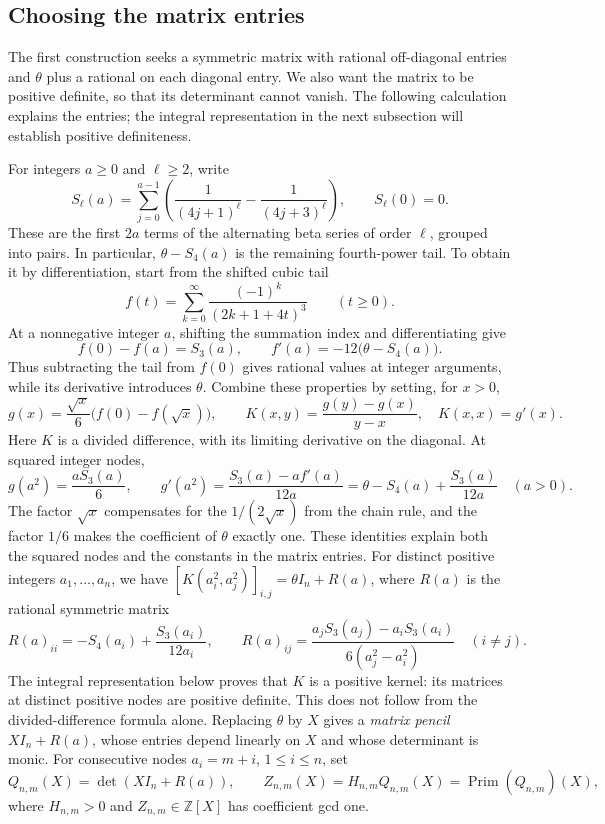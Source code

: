 \documentclass[11pt]{article}
\theoremstyle{definition}
\theoremstyle{remark}
\numberwithin{equation}{section}
\newcommand{\Z}{\mathbb Z}
\newcommand{\PP}{\operatorname{Prim}}
\begin{document}
\subsection{Choosing the matrix entries}\label{sec:kernel-construction}

The first construction seeks a symmetric matrix with rational
off-diagonal entries and $\theta$ plus a rational on each
diagonal entry. We also want the matrix to be positive definite, so
that its determinant cannot vanish. The following calculation explains
the entries; the integral representation in the next subsection will
establish positive definiteness.

For integers $a\geq 0$ and $\ell\geq 2$, write
\begin{equation}\label{eq:S}
 S_\ell(a)=\sum_{j=0}^{a-1}
 \left(\frac1{(4j+1)^\ell}-\frac1{(4j+3)^\ell}\right),
 \qquad S_\ell(0)=0.
\end{equation}
These are the first $2a$ terms of the alternating beta series of order
$\ell$, grouped into pairs. In particular, $\theta-S_4(a)$ is the
remaining fourth-power tail. To obtain it by differentiation, start
from the shifted cubic tail
\[
 f(t)=\sum_{k=0}^{\infty}\frac{(-1)^k}{(2k+1+4t)^3}
 \qquad(t\geq0).
\]
At a nonnegative integer $a$, shifting the summation index and
differentiating give
\[
 f(0)-f(a)=S_3(a),\qquad f'(a)=-12\bigl(\theta-S_4(a)\bigr).
\]
Thus subtracting the tail from $f(0)$ gives rational values at integer
arguments, while its derivative introduces $\theta$. Combine these
properties by setting, for $x>0$,
\[
 g(x)=\frac{\sqrt{x}}6\bigl(f(0)-f(\sqrt{x})\bigr),\qquad
 K(x,y)=\frac{g(y)-g(x)}{y-x},\quad K(x,x)=g'(x).
\]
Here $K$ is a divided difference, with its limiting derivative on the
diagonal. At squared integer nodes,
\[
 g(a^2)=\frac{aS_3(a)}6,\qquad
 g'(a^2)=\frac{S_3(a)-af'(a)}{12a}
        =\theta-S_4(a)+\frac{S_3(a)}{12a}\quad(a>0).
\]
The factor $\sqrt{x}$ compensates for the $1/(2\sqrt{x})$ from the
chain rule, and the factor $1/6$ makes the coefficient of $\theta$
exactly one. These identities explain both the squared nodes and
the constants in the matrix entries. For distinct positive integers
$a_1,\ldots,a_n$, we have
$[K(a_i^2,a_j^2)]_{i,j}=\theta I_n+R(a)$, where $R(a)$ is the rational
symmetric matrix
\begin{equation}\label{eq:R}
 R(a)_{ii}=-S_4(a_i)+\frac{S_3(a_i)}{12a_i},\qquad
 R(a)_{ij}=\frac{a_jS_3(a_j)-a_iS_3(a_i)}{6(a_j^2-a_i^2)}\quad(i\ne j).
\end{equation}
The integral representation below proves that $K$ is a
positive kernel: its matrices at distinct positive nodes are positive
definite. This does not follow from the divided-difference formula
alone. Replacing $\theta$ by $X$ gives a \emph{matrix pencil} $XI_n+R(a)$,
whose entries depend linearly on $X$ and whose determinant is monic.
For consecutive nodes $a_i=m+i$, $1\leq i\leq n$, set
\begin{equation}\label{eq:principal-Q}
 Q_{n,m}(X)=\det(XI_n+R(a)),\qquad
 Z_{n,m}(X)=H_{n,m}Q_{n,m}(X)=\PP(Q_{n,m})(X),
\end{equation}
where $H_{n,m}>0$ and $Z_{n,m}\in\Z[X]$ has coefficient gcd one.
\end{document}
